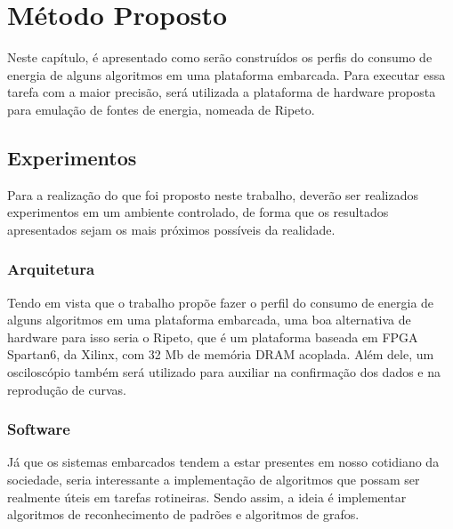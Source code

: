 \chapter{Método Proposto}\label{CAP3}

Neste capítulo, é apresentado como serão construídos os perfis do consumo de
energia de alguns algoritmos em uma plataforma embarcada. Para executar essa tarefa com
a maior precisão, será utilizada a plataforma de hardware proposta para emulação de fontes
de energia, nomeada de Ripeto.

\section{Experimentos}
Para a realização do que foi proposto neste trabalho, deverão ser realizados
experimentos em um ambiente controlado, de forma que os resultados apresentados sejam
os mais próximos possíveis da realidade.

\subsection{Arquitetura}
Tendo em vista que o trabalho propõe fazer o perfil do consumo de energia de
alguns algoritmos em uma plataforma embarcada, uma boa alternativa de hardware para
isso seria o Ripeto, que é um plataforma baseada em FPGA Spartan6, da Xilinx, com 32 Mb
de memória DRAM acoplada. Além dele, um osciloscópio também será utilizado para
auxiliar na confirmação dos dados e na reprodução de curvas.

\subsection{Software}
Já que os sistemas embarcados tendem a estar presentes em nosso cotidiano da
sociedade, seria interessante a implementação de algoritmos que possam ser realmente
úteis em tarefas rotineiras. Sendo assim, a ideia é implementar algoritmos de
reconhecimento de padrões e algoritmos de grafos.